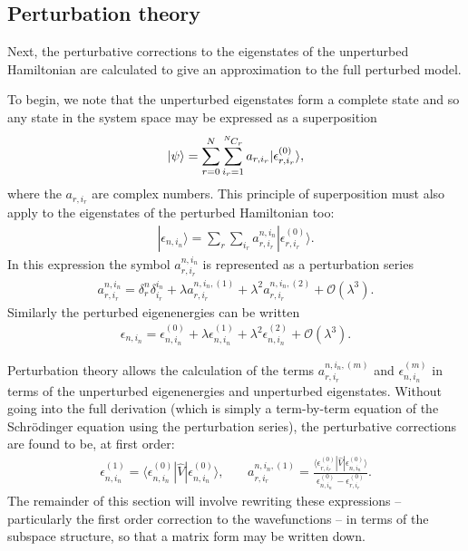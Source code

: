 \documentclass[a4paper]{memoir}
\newcommand{\bra}[1]{\langle#1|}
\newcommand{\ket}[1]{|#1\rangle}
\newcommand{\gap}{\,\,\,\,\,\,\,\,\,\,\,}
\newcommand{\Choose}[2]{{}^{#1}\hspace{-1pt}C_{#2}}
\newcommand{\enn}{\epsilon_{n,i_n}}
\newcommand{\ennpert}[1]{\epsilon^{(#1)}_{n,i_n}}
\newcommand{\enrnought}{\epsilon_{r,i_r}^{(0)}}
\newcommand{\ennnought}{\epsilon_{n,i_n}^{(0)}}
\newcommand{\anr}{a^{n,i_n}_{r,i_r}}
\newcommand{\anrnought}{\delta^n_r\delta^{i_n}_{i_r}}
\newcommand{\anrpert}[1]{a^{n,i_n,(#1)}_{r,i_r}}
\begin{document}
\subsection*{Perturbation theory}
%
Next, the perturbative corrections to the eigenstates of the
unperturbed Hamiltonian are calculated to give an approximation to the
full perturbed model.
\par To begin, we note that the unperturbed eigenstates form a
complete state and so any state in the system space may be expressed
as a superposition
\begin{align}
  \ket{\psi}=\sum_{r=0}^N\sum_{i_r=1}^{\Choose{N}{r}}a_{r,i_r}\ket{\enrnought},
\end{align}
where the $a_{r,i_r}$ are complex numbers. This principle of
superposition must also apply to the eigenstates of the perturbed
Hamiltonian too:
\begin{align}
  \ket{\enn}=\sum_{r}\sum_{i_r}\anr\ket{\enrnought}.
\end{align}
In this expression the symbol $\anr$ is represented as a perturbation
series
\begin{align}
  \anr = \anrnought+\lambda\anrpert{1} + \lambda^2\anrpert{2} +
  \mathcal{O}(\lambda^3).
\end{align}
Similarly the perturbed eigenenergies can be written
\begin{align}
  \enn = \ennnought+\lambda\ennpert{1}+\lambda^2\ennpert{2}
         +\mathcal{O}(\lambda^3).
\end{align}
%
\par Perturbation theory allows the calculation of the terms $\anrpert{m}$
and $\ennpert{m}$ in terms of the unperturbed eigenenergies and
unperturbed eigenstates. Without going into the full derivation (which
is simply a term-by-term equation of the Schr\"odinger equation using
the perturbation series), the perturbative corrections are found to be,
at first order:
\begin{align}
  \ennpert{1}=\bra{\ennnought}\hat{V}\ket{\ennnought},\gap
  \anrpert{1}=\frac{\bra{\enrnought}\hat{V}\ket{\ennnought}}
          {\ennnought-\enrnought}.
\end{align}
The remainder of this section will involve rewriting these expressions
-- particularly the first order correction to the wavefunctions -- in
terms of the subspace structure, so that a matrix form may be written
down.
%
\end{document}
